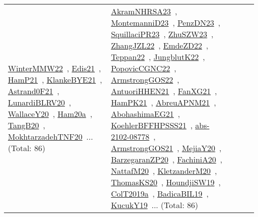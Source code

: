 {\begin{longtable}{lp{3cm}>{\raggedright\arraybackslash}p{6cm}>{\raggedright\arraybackslash}p{6cm}>{\raggedright\arraybackslash}p{8cm}}
\href{../works/WinterMMW22.pdf}{WinterMMW22}~\cite{WinterMMW22}, \href{../works/Edis21.pdf}{Edis21}~\cite{Edis21}, \href{../works/HamP21.pdf}{HamP21}~\cite{HamP21}, \href{../works/KlankeBYE21.pdf}{KlankeBYE21}~\cite{KlankeBYE21}, \href{../works/Astrand0F21.pdf}{Astrand0F21}~\cite{Astrand0F21}, \href{../works/LunardiBLRV20.pdf}{LunardiBLRV20}~\cite{LunardiBLRV20}, \href{../works/WallaceY20.pdf}{WallaceY20}~\cite{WallaceY20}, \href{../works/Ham20a.pdf}{Ham20a}~\cite{Ham20a}, \href{../works/TangB20.pdf}{TangB20}~\cite{TangB20}, \href{../works/MokhtarzadehTNF20.pdf}{MokhtarzadehTNF20}~\cite{MokhtarzadehTNF20}... (Total: 86) & \href{../works/AkramNHRSA23.pdf}{AkramNHRSA23}~\cite{AkramNHRSA23}, \href{../works/MontemanniD23.pdf}{MontemanniD23}~\cite{MontemanniD23}, \href{../works/PenzDN23.pdf}{PenzDN23}~\cite{PenzDN23}, \href{../works/SquillaciPR23.pdf}{SquillaciPR23}~\cite{SquillaciPR23}, \href{../works/ZhuSZW23.pdf}{ZhuSZW23}~\cite{ZhuSZW23}, \href{../works/ZhangJZL22.pdf}{ZhangJZL22}~\cite{ZhangJZL22}, \href{../works/EmdeZD22.pdf}{EmdeZD22}~\cite{EmdeZD22}, \href{../works/Teppan22.pdf}{Teppan22}~\cite{Teppan22}, \href{../works/JungblutK22.pdf}{JungblutK22}~\cite{JungblutK22}, \href{../works/PopovicCGNC22.pdf}{PopovicCGNC22}~\cite{PopovicCGNC22}, \href{../works/ArmstrongGOS22.pdf}{ArmstrongGOS22}~\cite{ArmstrongGOS22}, \href{../works/AntuoriHHEN21.pdf}{AntuoriHHEN21}~\cite{AntuoriHHEN21}, \href{../works/FanXG21.pdf}{FanXG21}~\cite{FanXG21}, \href{../works/HamPK21.pdf}{HamPK21}~\cite{HamPK21}, \href{../works/AbreuAPNM21.pdf}{AbreuAPNM21}~\cite{AbreuAPNM21}, \href{../works/AbohashimaEG21.pdf}{AbohashimaEG21}~\cite{AbohashimaEG21}, \href{../works/KoehlerBFFHPSSS21.pdf}{KoehlerBFFHPSSS21}~\cite{KoehlerBFFHPSSS21}, \href{../works/abs-2102-08778.pdf}{abs-2102-08778}~\cite{abs-2102-08778}, \href{../works/ArmstrongGOS21.pdf}{ArmstrongGOS21}~\cite{ArmstrongGOS21}, \href{../works/MejiaY20.pdf}{MejiaY20}~\cite{MejiaY20}, \href{../works/BarzegaranZP20.pdf}{BarzegaranZP20}~\cite{BarzegaranZP20}, \href{../works/FachiniA20.pdf}{FachiniA20}~\cite{FachiniA20}, \href{../works/NattafM20.pdf}{NattafM20}~\cite{NattafM20}, \href{../works/KletzanderM20.pdf}{KletzanderM20}~\cite{KletzanderM20}, \href{../works/ThomasKS20.pdf}{ThomasKS20}~\cite{ThomasKS20}, \href{../works/HoundjiSW19.pdf}{HoundjiSW19}~\cite{HoundjiSW19}, \href{../works/ColT2019a.pdf}{ColT2019a}~\cite{ColT2019a}, \href{../works/BadicaBIL19.pdf}{BadicaBIL19}~\cite{BadicaBIL19}, \href{../works/KucukY19.pdf}{KucukY19}~\cite{KucukY19}... (Total: 86)\\

\end{longtable}}
